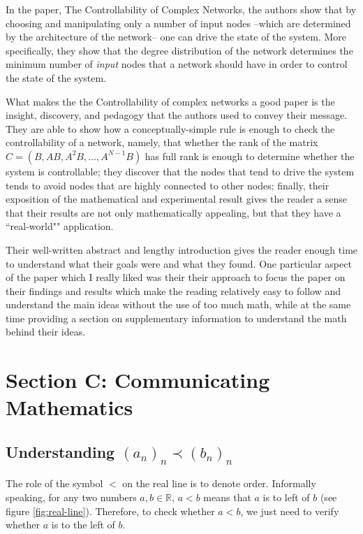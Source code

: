 \documentclass[11pt]{article}
\begin{document}
In the paper, The Controllability of Complex Networks, the authors show that by choosing and manipulating only a number of input nodes --which are determined by the architecture of the network-- one can drive the state of the system. More specifically, they show that the degree distribution of the network determines the minimum number of \textit{input} nodes that a network should have in order to control the state of the system.

What makes the the Controllability of complex networks a good paper is the insight, discovery, and pedagogy that the authors used to convey their message. They are able to show how a conceptually-simple rule is enough to check the controllability of a network, namely, that whether the rank of the matrix $C = (B, AB, A^2B, \ldots, A^{N-1}B)$  has full rank is enough to determine whether the system is controllable; they discover that the nodes that tend to drive the system tends to avoid nodes that are highly connected to other nodes; finally, their exposition of the mathematical and experimental result gives the reader a sense that their results are not only mathematically appealing, but that they have a ``real-world"" application.

Their well-written abstract and lengthy introduction gives the reader enough time to understand what their goals were and what they found. One particular aspect of the paper which I really liked was their their approach to focus the paper on their findings and results which make the reading relatively easy to follow and understand the main ideas without the use of too much math, while at the same time providing a section on supplementary information to understand the math behind their ideas.


\section*{Section C: Communicating Mathematics}

\subsection*{Understanding $(a_n)_n \prec (b_n)_n$}
The role of the symbol $<$ on the real line is to denote order. Informally speaking, for any two numbers $a, b \in \mathbb{R}$, $a < b$ means that $a$ is to left of $b$ (see figure \ref{fig:real-line}). Therefore, to check whether $a < b$, we just need to verify whether $a$ is to the left of $b$.

\begin{figure*}[h!]
	\centering
	
	\caption{Numbers on the real line. In this example, we see that $a < b$ since $a$ is to the left of $b$.}
	\label{fig:real-line}
\end{figure*}
\end{document}
